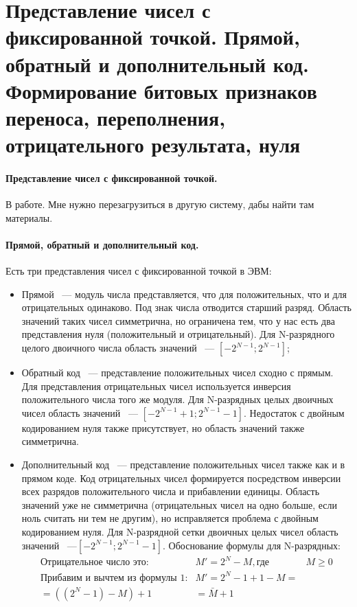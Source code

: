 \documentclass[10pt]{article}
\begin{document}
	\section{Представление чисел с фиксированной точкой. Прямой, обратный и дополнительный код. Формирование битовых признаков переноса, переполнения, отрицательного результата, нуля}
	\paragraph{Представление чисел с фиксированной точкой.}
	В работе. Мне нужно перезагрузиться в другую систему, дабы найти там материалы.
	\paragraph{Прямой, обратный и дополнительный код.}
	Есть три представления чисел с фиксированной точкой в ЭВМ:
	\begin{itemize}
		\item Прямой ~--- модуль числа представляется, что для положительных, что и для отрицательных одинаково. Под знак числа отводится старший разряд. Область значений таких чисел симметрична, но ограничена тем, что у нас есть два представления нуля (положительный и отрицательный). Для N-разрядного целого двоичного числа область значений ~--- $[-2^{N-1}; 2^{N-1}]$;
		\item Обратный код ~--- представление положительных чисел сходно с прямым. Для представления отрицательных чисел используется инверсия положительного числа того же модуля. Для N-разрядных целых двоичных чисел область значений ~--- $[-2^{N-1}+1;2^{N-1}-1]$. Недостаток с двойным кодированием нуля также присутствует, но область значений также симметрична.
		\item Дополнительный код ~--- представление положительных чисел также как и в прямом коде. Код отрицательных чисел формируется посредством инверсии всех разрядов положительного числа и прибавлении единицы. Область значений уже не симметрична (отрицательных чисел на одно больше, если ноль считать ни тем не другим), но исправляется проблема с двойным кодированием нуля. Для N-разрядной сетки двоичных целых чисел область значений ~---$[-2^{N-1};2^{N-1}-1]$. Обоснование формулы для N-разрядных:
		\begin{align*}
			\text{Отрицательное число это:} & M' = 2^N - M,
			\text{где } & M\ge 0\\
			\text{Прибавим и вычтем из формулы 1:} & M' = 2^N - 1 + 1 - M =\\
			= ((2^N - 1) - M) + 1 &= \bar M + 1
		\end{align*}
	\end{itemize}
\end{document}

